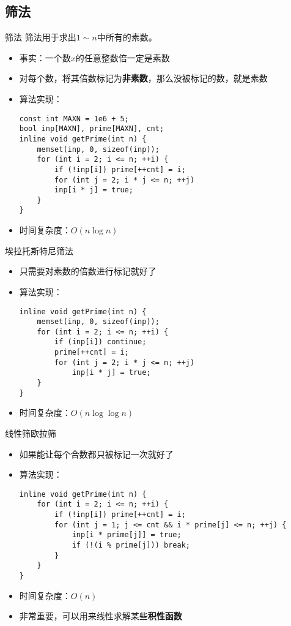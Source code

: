 \subsection{筛法}
\begin{frame}[fragile]{筛法}
  筛法用于求出$1\sim n$中所有的素数。
  \begin{itemize}
    \item 事实：一个数$x$的任意整数倍一定是素数
    \pause
    \item 对每个数，将其倍数标记为\textbf{非素数}，那么没被标记的数，就是素数
    \pause
    \item 算法实现：
\begin{lstlisting}
const int MAXN = 1e6 + 5;
bool inp[MAXN], prime[MAXN], cnt;
inline void getPrime(int n) {
    memset(inp, 0, sizeof(inp));
    for (int i = 2; i <= n; ++i) {
        if (!inp[i]) prime[++cnt] = i;
        for (int j = 2; i * j <= n; ++j)
        inp[i * j] = true;
    }
}
\end{lstlisting}
  \item 时间复杂度：$O(n\log{n})$
  \end{itemize}
\end{frame}

\begin{frame}[fragile]{埃拉托斯特尼筛法}
  \begin{itemize}
    \item 只需要对素数的倍数进行标记就好了
    \pause
    \item 算法实现：
\begin{lstlisting}
inline void getPrime(int n) {
    memset(inp, 0, sizeof(inp));
    for (int i = 2; i <= n; ++i) {
        if (inp[i]) continue; 
        prime[++cnt] = i;
        for (int j = 2; i * j <= n; ++j)
            inp[i * j] = true;
    }
}
\end{lstlisting}
    \item 时间复杂度：$O(n\log{\log{n}})$
  \end{itemize}
\end{frame}


\begin{frame}[fragile]{线性筛}{欧拉筛}
  \begin{itemize}
    \item 如果能让每个合数都只被标记一次就好了
    \pause
    \item 算法实现：
\begin{lstlisting}
inline void getPrime(int n) {
    for (int i = 2; i <= n; ++i) {
        if (!inp[i]) prime[++cnt] = i;
        for (int j = 1; j <= cnt && i * prime[j] <= n; ++j) {
            inp[i * prime[j]] = true;
            if (!(i % prime[j])) break;
        }
    }
}
\end{lstlisting}
    \pause
    \item 时间复杂度：$O(n)$
    \item 非常重要，可以用来线性求解某些\textbf{积性函数}
  \end{itemize}
\end{frame}